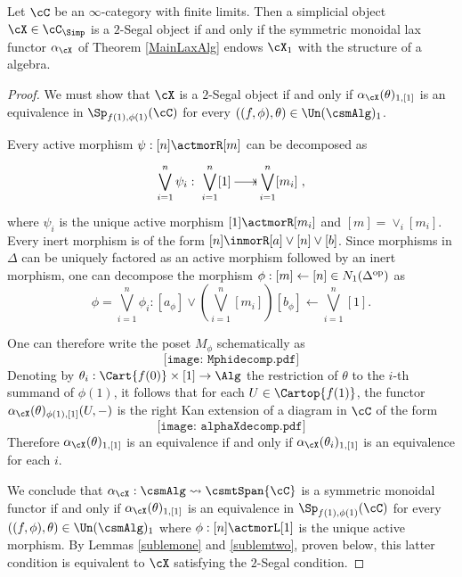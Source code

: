 \documentclass[a4paper]{article}
\numberwithin{equation}{section}
\begin{document}
\begin{thm}
 \label{MainAlg}
 Let $\cC$ be an $\infty$-category with finite limits. Then a simplicial object $\cX \in \cC_\Simp$ is a $2$-Segal object if and only if the symmetric monoidal lax functor $\alpha_\cX$ of Theorem \ref{MainLaxAlg} endows $\cX_1$ with the structure of a algebra. 
 \end{thm}
\begin{proof}
We must show that $\cX$ is a $2$-Segal object if and only if $\alpha_\cX(\theta)_{1,[1]}$ is an equivalence in $\Sp_{f(1),\phi(1)}(\cC)$ for every $\left((f,\phi), \theta\right) \in \Un(\csmAlg)_1$. 
 
 Every active morphism $\psi:[n] \actmorR [m]$ can be decomposed as 
 \begin{equation*}
 \bigvee_{i=1}^{n} \psi_i:\xymatrixcolsep{1.4pc}\xymatrix{\displaystyle\bigvee_{i=1}^{n}[1] \ar@{->|}[r]& \displaystyle\bigvee_{i=1}^{n}[m_i]},
 \end{equation*}
 where $\psi_i$ is the unique active morphism $[1] \actmorR [m_i]$ and $[m] = \vee_i [m_i]$. Every inert morphism is of the form $[n] \inmorR [a] \vee [n] \vee [b]$. Since morphisms in $\Delta$ can be uniquely factored as an active morphism followed by an inert morphism, one can decompose the morphism $\phi:[m]\leftarrow[n] \in N_1(\Delta^{\rm op})$ as
 \begin{equation*}
  \phi= \bigvee_{i=1}^{n} \phi_i : [a_\phi] \vee \left(\bigvee_{i=1}^n [m_i]\right) [b_\phi] \leftarrow \bigvee_{i=1}^n [1].
 \end{equation*}

 One can therefore write the poset $M_\phi$ schematically as
 \begin{equation*}
  \texttt{[image: Mphidecomp.pdf]}
 \end{equation*}
Denoting by $\theta_i: \Cart{f(0)} \times [1] \to \Alg$ the restriction of $\theta$ to the $i$-th summand of $\phi(1)$, it follows that for each $U \in \Cartop{f(1)}$, the functor $\alpha_\cX(\theta)_{\phi(1),[1]}(U,-)$ is the right Kan extension of a diagram in $\cC$ of the form
\begin{equation*}
  \texttt{[image: alphaXdecomp.pdf]}
 \end{equation*}
Therefore $\alpha_\cX(\theta)_{1,[1]}$ is an equivalence if and only if $\alpha_\cX(\theta_i)_{1,[1]}$ is an equivalence for each $i$. 

We conclude that $\alpha_\cX: \csmAlg \rightsquigarrow \csmtSpan{\cC}$ is a symmetric monoidal functor if and only if $\alpha_\cX(\theta)_{1,[1]}$ is an equivalence in $\Sp_{f(1),\phi(1)}(\cC)$ for every $\left((f,\phi), \theta\right) \in \Un(\csmAlg)_1$ where $\phi:[n] \actmorL [1]$ is the unique active morphism. By Lemmas \ref{sublemone} and \ref{sublemtwo}, proven below, this latter condition is equivalent to $\cX$ satisfying the $2$-Segal condition.
\end{proof}
\end{document}
